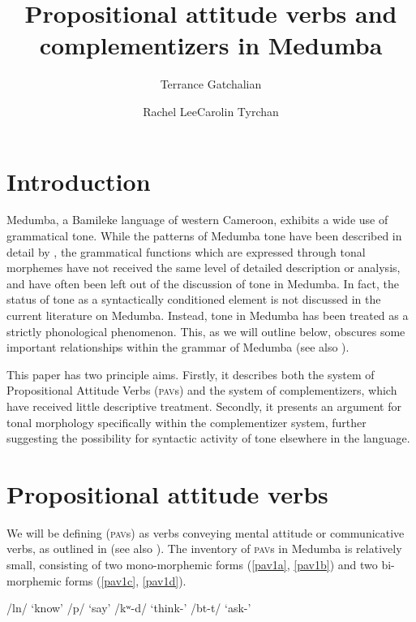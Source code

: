 \documentclass[output=paper,colorlinks,citecolor=brown]{langscibook}
\author{Terrance Gatchalian\affiliation{University of British Columbia}\and Rachel Lee\affiliation{University of British Columbia}\lastand  Carolin Tyrchan\affiliation{University of Potsdam}}
\title{Propositional attitude verbs and complementizers in Medumba}
\begin{document}
\maketitle

\section{Introduction}

Medumba, a Bamileke language of western Cameroon, exhibits a wide use of grammatical tone. While the patterns of Medumba tone have been described in detail by \cite{Voorhoeve1971}, the grammatical functions which are expressed through tonal morphemes have not received the same level of detailed description or analysis, and have often been left out of the discussion of tone in Medumba. In fact, the status of tone as a syntactically conditioned element is not discussed in the current literature on Medumba. Instead, tone in Medumba has been treated as a strictly phonological phenomenon. This, as we will outline below, obscures some important relationships within the grammar of Medumba (see also \citealt{Keupdjio2020}).

This paper has two principle aims. Firstly, it describes both the system of Propositional Attitude Verbs (\textsc{pav}s) and the system of complementizers, which have received little descriptive treatment. Secondly, it presents an argument for tonal morphology specifically within the complementizer system, further suggesting the possibility for syntactic activity of tone elsewhere in the language.

\section{Propositional attitude verbs}

We will be defining  (\textsc{pav}s) as verbs conveying mental attitude or communicative verbs, as outlined in \citet{PearsonForthcoming} (see also \citealt{Asher1987}). The inventory of \textsc{pav}s in Medumba is relatively small, consisting of two mono-morphemic forms (\ref{pav1a}, \ref{pav1b}) and two bi-morphemic forms (\ref{pav1c}, \ref{pav1d}).

\ea \label{PAV1}
    \begin{xlist}
    \ex /l\epL n/                   \tab `know'                  \label{pav1a}
    \ex /p/                   \tab `say'                   \label{pav1b}
    \ex /kʷ\epL-d\schwaL/   \tab `think-'      \label{pav1c}
    \ex /b\epH t-t\schwaH/          \tab `ask-'        \label{pav1d}
    \end{xlist}
\z
\end{document}
